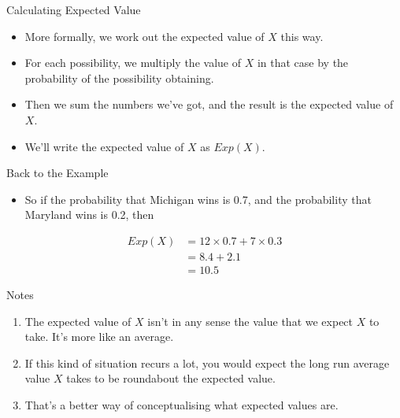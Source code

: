 \documentclass[
  ignorenonframetext,
]{beamer}
\providecommand{\tightlist}{%
  \setlength{\itemsep}{0pt}\setlength{\parskip}{0pt}}
\renewcommand{\,}{\text{, }}
\begin{document}
\begin{frame}{Calculating Expected Value}
\protect\hypertarget{calculating-expected-value}{}

\begin{itemize}
\tightlist
\item
  More formally, we work out the expected value of \(X\) this way.
\item
  For each possibility, we multiply the value of \(X\) in that case by
  the probability of the possibility obtaining.
\item
  Then we sum the numbers we've got, and the result is the expected
  value of \(X\).
\item
  We'll write the expected value of \(X\) as \(Exp(X)\).
\end{itemize}

\end{frame}

\begin{frame}{Back to the Example}
\protect\hypertarget{back-to-the-example}{}

\begin{itemize}
\tightlist
\item
  So if the probability that Michigan wins is 0.7, and the probability
  that Maryland wins is 0.2, then
\end{itemize}

\begin{align*}
Exp(X) &= 12 \times 0.7 + 7 \times 0.3 \\
 &= 8.4 + 2.1 \\
 &= 10.5
\end{align*}

\end{frame}

\begin{frame}{Notes}
\protect\hypertarget{notes}{}

\begin{enumerate}
\tightlist
\item
  The expected value of \(X\) isn't in any sense the value that we
  expect \(X\) to take. It's more like an average.
\item
  If this kind of situation recurs a lot, you would expect the long run
  average value \(X\) takes to be roundabout the expected value.
\item
  That's a better way of conceptualising what expected values are.
\end{enumerate}

\end{frame}
\end{document}
